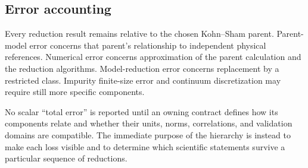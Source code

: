 \subsection{Error accounting}


Every reduction result remains relative to the chosen Kohn--Sham parent.
Parent-model error concerns that parent's relationship to independent physical
references. Numerical error concerns approximation of the parent calculation
and the reduction algorithms. Model-reduction error concerns replacement by a
restricted class. Impurity finite-size error and continuum discretization may
require still more specific components.

No scalar ``total error'' is reported until an owning contract defines how its
components relate and whether their units, norms, correlations, and validation
domains are compatible. The immediate purpose of the hierarchy is instead to
make each loss visible and to determine which scientific statements survive a
particular sequence of reductions.
